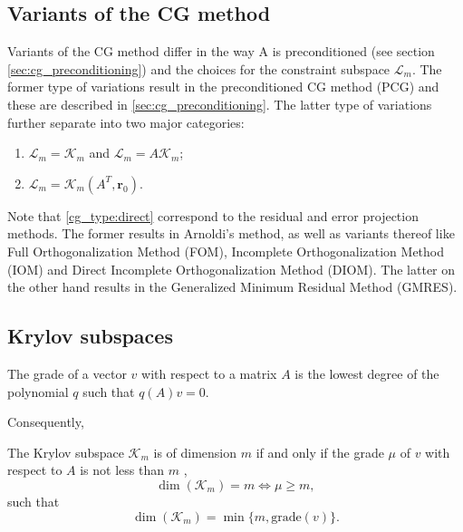 \subsection{Variants of the CG method} \label{sec:cg_variants}
Variants of the CG method differ in the way A is preconditioned (see section \cref{sec:cg_preconditioning}) and the choices for the constraint subspace $\mathcal{L}_m$. The former type of variations result in the preconditioned CG method (PCG) and these are described in \cref{sec:cg_preconditioning}. The latter type of variations further separate into two major categories:
\begin{enumerate}[label=\roman*,ref=CG-type \roman*]
  \item\label{cg_type:direct} $\mathcal{L}_m = \mathcal{K}_m$ and $\mathcal{L}_m = A\mathcal{K}_m$;
  \item\label{cg_type:transpose}$\mathcal{L}_m = \mathcal{K}_m(A^T,\mathbf{r}_0)$.
\end{enumerate}
Note that \cref{cg_type:direct} correspond to the residual and error projection methods. The former results in Arnoldi's method, as well as variants thereof like Full Orthogonalization Method (FOM), Incomplete Orthogonalization Method (IOM) and Direct Incomplete Orthogonalization Method (DIOM). The latter on the other hand results in the Generalized Minimum Residual Method (GMRES).

\subsection{Krylov subspaces}
\begin{definition}
  The grade of a vector $v$ with respect to a matrix $A$ is the lowest degree of the polynomial $q$ such that $q(A)v = 0$.
  \label{def:cg_grade}
\end{definition}
Consequently,
\begin{theorem}
  The Krylov subspace $\mathcal{K}_m$ is of dimension $m$ if and only if the grade $\mu$ of $v$ with respect to $A$ is not less than $m$ \cite[proposition 6.2]{iter_method_saad},
  \begin{equation*}
    \dim(\mathcal{K}_m) = m \iff \mu \geq m,
  \end{equation*}
  such that
  \begin{equation}
    \dim(\mathcal{K}_m) = \min \{m, \textrm{grade}(v)\}.
    \label{eq:cg_krylov_dimension}
  \end{equation}
  \label{th:cg_krylov_dimension}
\end{theorem}

